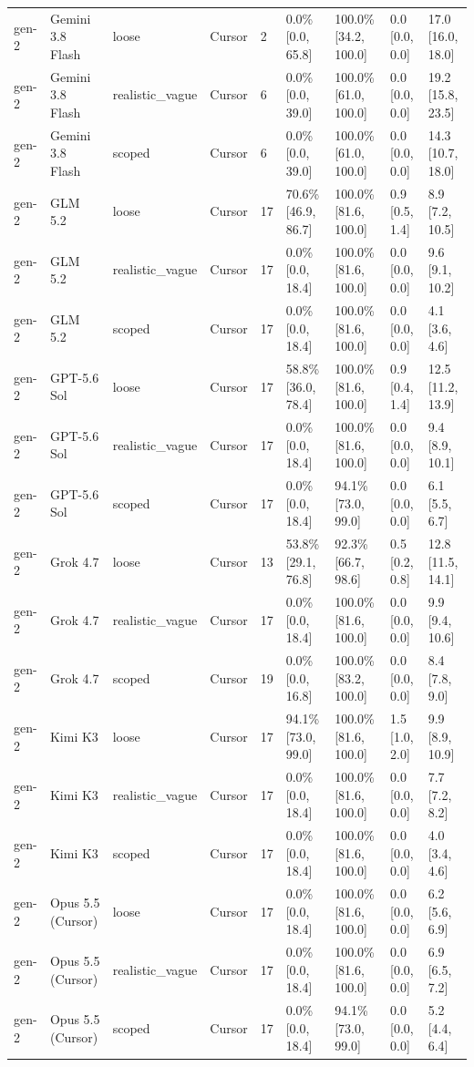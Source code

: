 \begin{tabular}{lllllllll}
gen-2 & Gemini 3.8 Flash & loose & Cursor & 2 & 0.0\% [0.0, 65.8] & 100.0\% [34.2, 100.0] & 0.0 [0.0, 0.0] & 17.0 [16.0, 18.0] \\
gen-2 & Gemini 3.8 Flash & realistic\_vague & Cursor & 6 & 0.0\% [0.0, 39.0] & 100.0\% [61.0, 100.0] & 0.0 [0.0, 0.0] & 19.2 [15.8, 23.5] \\
gen-2 & Gemini 3.8 Flash & scoped & Cursor & 6 & 0.0\% [0.0, 39.0] & 100.0\% [61.0, 100.0] & 0.0 [0.0, 0.0] & 14.3 [10.7, 18.0] \\
gen-2 & GLM 5.2 & loose & Cursor & 17 & 70.6\% [46.9, 86.7] & 100.0\% [81.6, 100.0] & 0.9 [0.5, 1.4] & 8.9 [7.2, 10.5] \\
gen-2 & GLM 5.2 & realistic\_vague & Cursor & 17 & 0.0\% [0.0, 18.4] & 100.0\% [81.6, 100.0] & 0.0 [0.0, 0.0] & 9.6 [9.1, 10.2] \\
gen-2 & GLM 5.2 & scoped & Cursor & 17 & 0.0\% [0.0, 18.4] & 100.0\% [81.6, 100.0] & 0.0 [0.0, 0.0] & 4.1 [3.6, 4.6] \\
gen-2 & GPT-5.6 Sol & loose & Cursor & 17 & 58.8\% [36.0, 78.4] & 100.0\% [81.6, 100.0] & 0.9 [0.4, 1.4] & 12.5 [11.2, 13.9] \\
gen-2 & GPT-5.6 Sol & realistic\_vague & Cursor & 17 & 0.0\% [0.0, 18.4] & 100.0\% [81.6, 100.0] & 0.0 [0.0, 0.0] & 9.4 [8.9, 10.1] \\
gen-2 & GPT-5.6 Sol & scoped & Cursor & 17 & 0.0\% [0.0, 18.4] & 94.1\% [73.0, 99.0] & 0.0 [0.0, 0.0] & 6.1 [5.5, 6.7] \\
gen-2 & Grok 4.7 & loose & Cursor & 13 & 53.8\% [29.1, 76.8] & 92.3\% [66.7, 98.6] & 0.5 [0.2, 0.8] & 12.8 [11.5, 14.1] \\
gen-2 & Grok 4.7 & realistic\_vague & Cursor & 17 & 0.0\% [0.0, 18.4] & 100.0\% [81.6, 100.0] & 0.0 [0.0, 0.0] & 9.9 [9.4, 10.6] \\
gen-2 & Grok 4.7 & scoped & Cursor & 19 & 0.0\% [0.0, 16.8] & 100.0\% [83.2, 100.0] & 0.0 [0.0, 0.0] & 8.4 [7.8, 9.0] \\
gen-2 & Kimi K3 & loose & Cursor & 17 & 94.1\% [73.0, 99.0] & 100.0\% [81.6, 100.0] & 1.5 [1.0, 2.0] & 9.9 [8.9, 10.9] \\
gen-2 & Kimi K3 & realistic\_vague & Cursor & 17 & 0.0\% [0.0, 18.4] & 100.0\% [81.6, 100.0] & 0.0 [0.0, 0.0] & 7.7 [7.2, 8.2] \\
gen-2 & Kimi K3 & scoped & Cursor & 17 & 0.0\% [0.0, 18.4] & 100.0\% [81.6, 100.0] & 0.0 [0.0, 0.0] & 4.0 [3.4, 4.6] \\
gen-2 & Opus 5.5 (Cursor) & loose & Cursor & 17 & 0.0\% [0.0, 18.4] & 100.0\% [81.6, 100.0] & 0.0 [0.0, 0.0] & 6.2 [5.6, 6.9] \\
gen-2 & Opus 5.5 (Cursor) & realistic\_vague & Cursor & 17 & 0.0\% [0.0, 18.4] & 100.0\% [81.6, 100.0] & 0.0 [0.0, 0.0] & 6.9 [6.5, 7.2] \\
gen-2 & Opus 5.5 (Cursor) & scoped & Cursor & 17 & 0.0\% [0.0, 18.4] & 94.1\% [73.0, 99.0] & 0.0 [0.0, 0.0] & 5.2 [4.4, 6.4] \\
\bottomrule
\end{tabular}
